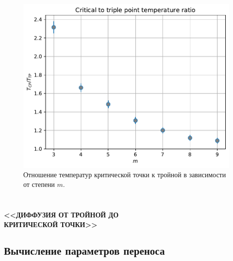 \documentclass[pdf,hyperref={unicode}]{beamer}
\begin{document}
\begin{frame}
\begin{columns}
\begin{column}{0.47\linewidth}
\begin{figure}[h]
\begin{center}
\includegraphics[width=\textwidth]{effect_of_long-range_attraction}
\caption{\tiny Отношение температур критической точки к тройной в зависимости от степени $m$.}
\label{risTcpTtpWidoml}
\end{center}
\end{figure}

\end{column}

\end{columns}

\end{frame}



\subsection{ }


\begin{frame}
\begin{center}
\vspace{5mm}
\textbf{<<ДИФФУЗИЯ ОТ ТРОЙНОЙ ДО \\ КРИТИЧЕСКОЙ ТОЧКИ>>}
\end{center}
\end{frame}


\subsection{Вычисление параметров переноса}
\end{document}
